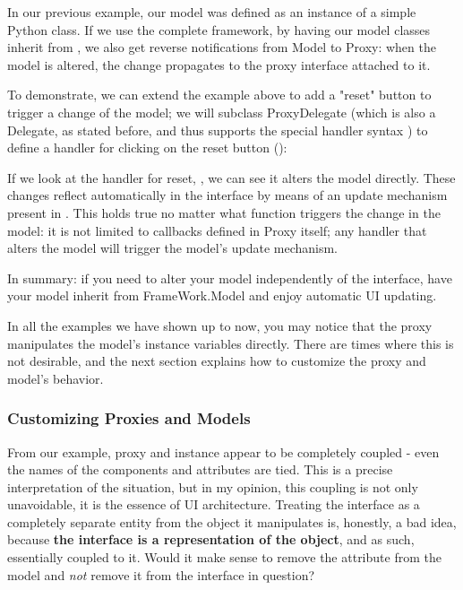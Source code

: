 \documentclass[a4paper]{howto}
\begin{document}
In our previous example, our model was defined as an instance of a
simple Python class. If we use the complete framework, by having our
model classes inherit from , we also get reverse
notifications from Model to Proxy: when the model is altered, the change
propagates to the proxy interface attached to it.

To demonstrate, we can extend the example above to add a "reset" button
to trigger a change of the model; we will subclass ProxyDelegate (which is
also a Delegate, as stated before, and thus supports the special handler
syntax ) to define a handler for clicking on the reset
button ():



If we look at the handler for reset, , we
can see it alters the model directly. These changes reflect
automatically in the interface by means of an update mechanism present
in . This holds true no matter what function
triggers the change in the model: it is not limited to callbacks defined
in Proxy itself; any handler that alters the model will trigger the
model's update mechanism.

In summary: if you need to alter your model independently of the
interface, have your model inherit from FrameWork.Model and enjoy
automatic UI updating.

In all the examples we have shown up to now, you may notice that the
proxy manipulates the model's instance variables directly. There are
times where this is not desirable, and the next section explains how to
customize the proxy and model's behavior.

\subsubsection{Customizing Proxies and Models}

From our example, proxy and instance appear to be completely coupled -
even the names of the components and attributes are tied. This is a
precise interpretation of the situation, but in my opinion, this
coupling is not only unavoidable, it is the essence of UI architecture.
Treating the interface as a completely separate entity from the object
it manipulates is, honestly, a bad idea, because {\bf the interface is a
representation of the object}, and as such, essentially coupled to it.
Would it make sense to remove the  attribute from the model
and {\it not} remove it from the interface in question?
\end{document}
